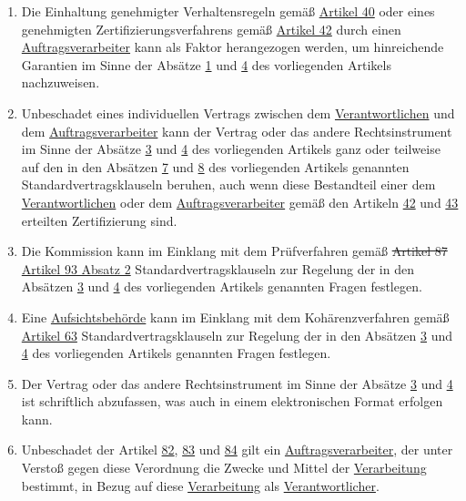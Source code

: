 \begin{enumerate}
  \item Die Einhaltung genehmigter Verhaltensregeln gemäß \hyperref[ch:40]{Artikel 40} oder eines genehmigten
   Zertifizierungsverfahrens gemäß \hyperref[ch:42]{Artikel 42} durch einen \hyperref[itm:04-8]{Auftragsverarbeiter} kann als Faktor
   herangezogen werden, um hinreichende Garantien im Sinne der Absätze \hyperref[itm:28-1]{1} und \hyperref[itm:28-4]
   {4} des vorliegenden Artikels nachzuweisen.
  \label{itm:28-5}

  \item Unbeschadet eines individuellen Vertrags zwischen dem \hyperref[itm:04-7]{Verantwortlichen} und dem \hyperref[itm:04-8]{Auftragsverarbeiter} kann der
   Vertrag oder das andere Rechtsinstrument im Sinne der Absätze \hyperref[itm:28-3-1]{3} und \hyperref[itm:28-4]{4} des
   vorliegenden Artikels ganz oder teilweise auf den in den Absätzen \hyperref[itm:28-7]{7} und \hyperref[itm:28-8]
   {8} des vorliegenden Artikels genannten Standardvertragsklauseln beruhen, auch wenn diese Bestandteil einer dem
   \hyperref[itm:04-7]{Verantwortlichen} oder dem \hyperref[itm:04-8]{Auftragsverarbeiter} gemäß den Artikeln \hyperref[ch:42]{42} und \hyperref[ch:43]{43}
   erteilten Zertifizierung sind.
  \label{itm:28-6}

  \item Die Kommission kann im Einklang mit dem Prüfverfahren gemäß \sout{Artikel 87} \hyperref[itm:93-2]{Artikel 93
   Absatz 2} Standardvertragsklauseln zur Regelung der in den Absätzen \hyperref[itm:28-3-1]{3} und \hyperref[itm:28-4]
   {4} des vorliegenden Artikels genannten Fragen festlegen.
  \label{itm:28-7}

  \item Eine \hyperref[itm:04-21]{Aufsichtsbehörde} kann im Einklang mit dem Kohärenzverfahren gemäß \hyperref[ch:63]{Artikel 63}
   Standardvertragsklauseln zur Regelung der in den Absätzen \hyperref[itm:28-3-1]{3} und \hyperref[itm:28-4]{4} des
   vorliegenden Artikels genannten Fragen festlegen.
  \label{itm:28-8}

  \item Der Vertrag oder das andere Rechtsinstrument im Sinne der Absätze \hyperref[itm:28-3-1]{3} und \hyperref
  [itm:28-4]
   {4} ist schriftlich abzufassen, was auch in einem elektronischen Format erfolgen kann.
  \label{itm:28-9}

  \item Unbeschadet der Artikel \hyperref[ch:82]{82}, \hyperref[ch:83]{83} und \hyperref[ch:84]{84} gilt ein
   \hyperref[itm:04-8]{Auftragsverarbeiter}, der unter Verstoß gegen diese Verordnung die Zwecke und Mittel der \hyperref[itm:04-2]{Verarbeitung} bestimmt, in
   Bezug auf diese \hyperref[itm:04-2]{Verarbeitung} als \hyperref[itm:04-7]{Verantwortlicher}.
  \label{itm:28-10}

\end{enumerate}

